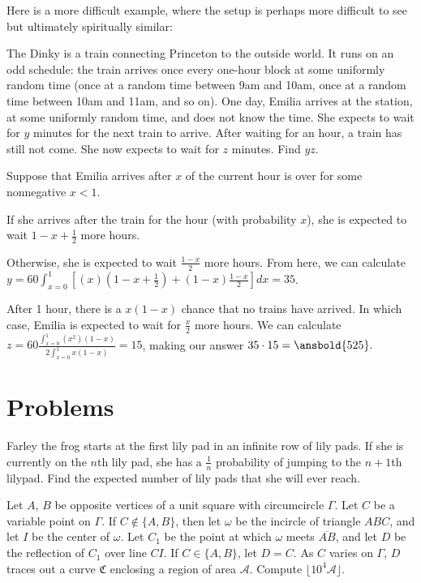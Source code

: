 \documentclass[mast]{lucky}
\begin{document}
Here is a more difficult example, where the setup is perhaps more difficult to see but ultimately spiritually similar:
\begin{exam}
The Dinky is a train connecting Princeton to the outside world. It runs on an odd schedule:
the train arrives once every one-hour block at some uniformly random time (once at a random
time between 9am and 10am, once at a random time between 10am and 11am, and so on).
One day, Emilia arrives at the station, at some uniformly random time, and does not know
the time. She expects to wait for $y$ minutes for the next train to arrive. After waiting for an
hour, a train has still not come. She now expects to wait for $z$ minutes. Find $yz$.
\end{exam}
\begin{sol}
Suppose that Emilia arrives after $x$ of the current hour is over for some nonnegative $x<1$.

If she arrives after the train for the hour (with probability $x$), she is expected to wait $1-x+\frac{1}{2}$ more hours.

Otherwise, she is expected to wait $\frac{1-x}{2}$ more hours. From here, we can calculate $y=60\int_{x=0}^{1}[(x)(1-x+\frac{1}{2})+(1-x)\frac{1-x}{2}]dx=35$.

After 1 hour, there is a $x(1-x)$ chance that no trains have arrived. In which case, Emilia is expected to wait for $\frac{x}{2}$ more hours. We can calculate $z=60\frac{\int_{x=0}^{1}(x^2)(1-x)}{2\int_{x=0}^{1}x(1-x)}=15$, making our answer $35\cdot 15=\ansbold{525}.$
\end{sol}



\section{Problems}
\noindent{}

\begin{prob}[SMT 2021]{2}
Farley the frog starts at the first lily pad in an infinite row of lily pads. If she is currently on the $n$th lily pad, she has a $\frac{1}{n}$ probability of jumping to the $n+1$th lilypad. Find the expected number of lily pads that she will ever reach.
\end{prob}

\begin{prob}{13}
Let $A$, $B$ be opposite vertices of a unit square with circumcircle $\Gamma$. Let $C$ be a variable point on $\Gamma$. If $C\not\in\{A, B\}$, then let $\omega$ be the incircle of triangle $ABC$, and let $I$ be the center of $\omega$. Let $C_1$ be the point at which $\omega$ meets $\overline{AB}$, and let $D$ be the reflection of $C_1$ over line $CI$. If $C \in\{A, B\}$, let $D = C$. As $C$ varies on $\Gamma$, $D$ traces out a curve $\mathfrak C$ enclosing a region of area $\mathcal A$. Compute $\lfloor 10^4 \mathcal A\rfloor$.
\end{prob}
\end{document}
